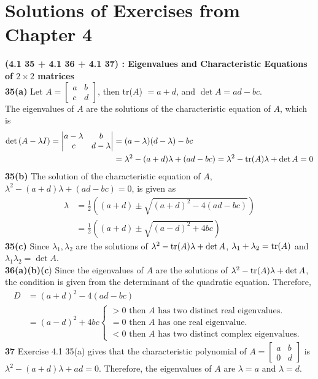 \section{Solutions of Exercises from Chapter 4}
\textbf{(4.1 35 + 4.1 36 + 4.1 37) : Eigenvalues and Characteristic Equations of $2 \times 2$ matrices} \\
\textbf{35(a)} Let $A = \begin{bmatrix}
	a & b \\ c & d
\end{bmatrix}$, then tr($A$) $= a + d$, and $\det{A} = ad-bc$.\\
The eigenvalues of $A$ are the solutions of the characteristic equation of $A$, which is \begin{align*}
	\det{(A - \lambda I)} = \begin{vmatrix}
		a - \lambda & b \\ c & d - \lambda
	\end{vmatrix} &= (a - \lambda)(d-\lambda) - bc \\
	 &= \lambda^2 - (a+d)\lambda + (ad - bc) = \lambda^2 - \textnormal{tr}(A)\lambda + \det{A} = 0
\end{align*}
\textbf{35(b)} The solution of the characteristic equation of $A$, $\lambda^2 - (a+d)\lambda + (ad - bc) = 0$, is given as \begin{align*}
	\lambda &= \frac{1}{2}((a + d) \pm \sqrt{(a + d)^2 - 4(ad - bc)}) \\
	&= \frac{1}{2}((a + d) \pm \sqrt{(a - d)^2 + 4bc})
\end{align*}
\textbf{35(c)} Since $\lambda_1, \lambda_2$ are the solutions of $\lambda^2 - \textnormal{tr}(A)\lambda + \det{A}$, $\lambda_1 + \lambda_2 = \textnormal{tr}(A)$ and $\lambda_1\lambda_2 = \det{A}$. \\

\textbf{36(a)(b)(c}) Since the eigenvalues of $A$ are the solutions of $\lambda^2 - \textnormal{tr}(A)\lambda + \det{A}$, the condition is given from the determinant of the quadratic equation. Therefore, \begin{align*}
	D &= (a+d)^2 - 4(ad - bc) \\ &= (a-d)^2 + 4bc \begin{cases}
		> 0 \mbox{ then $A$ has two distinct real eigenvalues. } \\
		= 0 \mbox{ then $A$ has one real eigenvalue. } \\
		< 0 \mbox{ then $A$ has two distinct complex eigenvalues. }
	\end{cases}
\end{align*}
\textbf{37} Exercise 4.1 35(a) gives that the characteristic polynomial of $A = \begin{bmatrix}
	a & b \\ 0 & d
\end{bmatrix}$ is $\lambda^2 - (a + d)\lambda + ad = 0$. Therefore, the eigenvalues of $A$ are $\lambda = a$ and $\lambda = d$. \\

